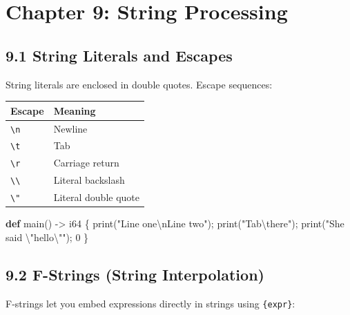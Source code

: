\documentclass[
  english,
]{book}
\newenvironment{Shaded}{\begin{snugshade}}{\end{snugshade}}
\newcommand{\DataTypeTok}[1]{\textcolor[rgb]{0.31,0.79,0.69}{#1}}
\newcommand{\DecValTok}[1]{\textcolor[rgb]{0.71,0.81,0.66}{#1}}
\newcommand{\FunctionTok}[1]{\textcolor[rgb]{0.86,0.86,0.67}{#1}}
\newcommand{\KeywordTok}[1]{\textcolor[rgb]{0.34,0.61,0.84}{\textbf{#1}}}
\newcommand{\NormalTok}[1]{\textcolor[rgb]{0.83,0.83,0.83}{#1}}
\newcommand{\OperatorTok}[1]{\textcolor[rgb]{0.83,0.83,0.83}{#1}}
\newcommand{\StringTok}[1]{\textcolor[rgb]{0.81,0.57,0.47}{#1}}
\begin{document}
\section{Chapter 9: String
Processing}\label{chapter-9-string-processing}

\subsection{9.1 String Literals and
Escapes}\label{string-literals-and-escapes}

String literals are enclosed in double quotes. Escape sequences:

\begin{longtable}[]{@{}ll@{}}
\toprule\noalign{}
Escape & Meaning \\
\midrule\noalign{}
\endhead
\bottomrule\noalign{}
\endlastfoot
\texttt{\textbackslash{}n} & Newline \\
\texttt{\textbackslash{}t} & Tab \\
\texttt{\textbackslash{}r} & Carriage return \\
\texttt{\textbackslash{}\textbackslash{}} & Literal backslash \\
\texttt{\textbackslash{}"} & Literal double quote \\
\end{longtable}

\begin{Shaded}
\begin{Highlighting}[]
\KeywordTok{def}\NormalTok{ main() }\OperatorTok{{-}\textgreater{}} \DataTypeTok{i64}\NormalTok{ \{}
    \FunctionTok{print}\NormalTok{(}\StringTok{"Line one\textbackslash{}nLine two"}\NormalTok{);}
    \FunctionTok{print}\NormalTok{(}\StringTok{"Tab\textbackslash{}there"}\NormalTok{);}
    \FunctionTok{print}\NormalTok{(}\StringTok{"She said \textbackslash{}"}\NormalTok{hello\textbackslash{}}\StringTok{""}\NormalTok{);}
    \DecValTok{0}
\NormalTok{\}}
\end{Highlighting}
\end{Shaded}

\subsection{9.2 F-Strings (String
Interpolation)}\label{f-strings-string-interpolation}

F-strings let you embed expressions directly in strings using
\texttt{\{expr\}}:
\end{document}
